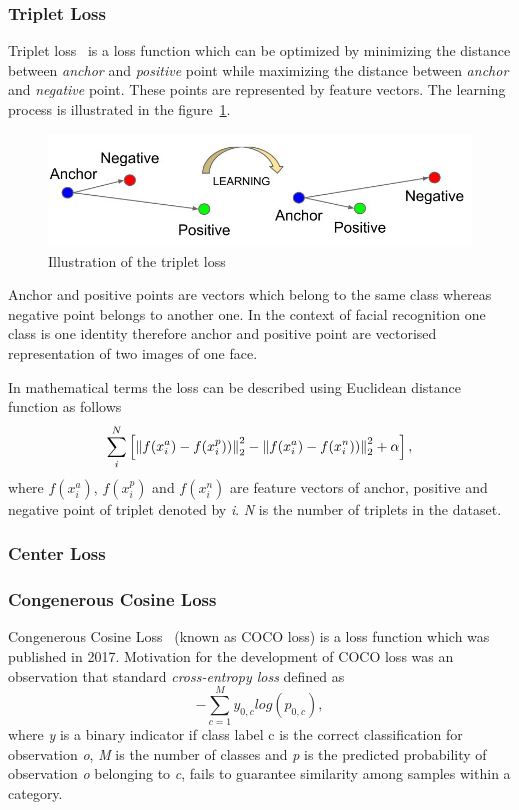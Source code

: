 \subsubsection{Triplet Loss}\label{subsubsec:triplet-loss}
Triplet loss~\cite{TripletLoss} is a loss function which can be optimized by minimizing the distance between
\textit{anchor} and \textit{positive} point while maximizing the distance between \textit{anchor} and \textit{negative}
point.
These points are represented by feature vectors.
The learning process is illustrated in the figure~\ref{fig:tripletloss}.

\begin{figure}[H]
    \centering
    \includegraphics[width=\columnwidth]{images/face-recognition/tripletloss.jpeg}
    \caption{Illustration of the triplet loss~\cite{TripletLoss}}
    \label{fig:tripletloss}
\end{figure}

Anchor and positive points are vectors which belong to the same class whereas negative point belongs to another one.
In the context of facial recognition one class is one identity therefore anchor and positive point are vectorised
representation of two images of one face.

In mathematical terms the loss can be described using Euclidean distance function as follows
\begin{equation}
    \sum_{i}^{N} \left[ \left\lVert f(x_{i}^{a}) - f(x_{i}^{p}))\right\rVert^2_2
    - \left\lVert f(x_{i}^{a}) - f(x_{i}^{n}))\right\rVert^2_2 + \alpha \right],
\end{equation}
where $f(x_{i}^{a})$, $f(x_{i}^{p})$ and $f(x_{i}^{n})$ are feature vectors of anchor, positive and
negative point of triplet denoted by \textit{i}.
\textit{N} is the number of triplets in the dataset.

\subsubsection{Center Loss}

\subsubsection{Congenerous Cosine Loss}
Congenerous Cosine Loss~\cite{CocoLoss} (known as COCO loss) is a loss function which was published in 2017.
Motivation for the development of COCO loss was an observation that standard \textit{cross-entropy loss} defined as
\begin{equation}
    - \sum_{c=1}^{M} y_{0,c} log(p_{0,c}),
\end{equation}
where \textit{y} is a binary indicator if class label c is the correct classification for observation \textit{o},
\textit{M} is the number of classes and \textit{p} is the predicted probability of observation \textit{o} belonging
to \textit{c}, fails to guarantee similarity among samples within a category.

